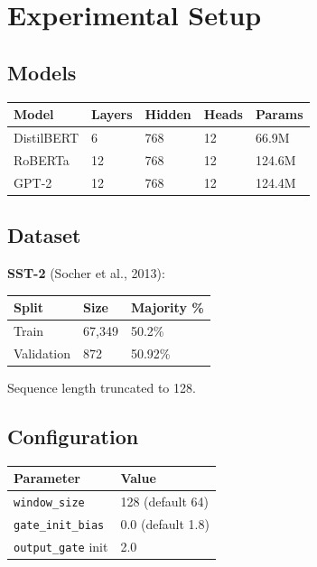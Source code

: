 
\section{Experimental Setup}

\subsection{Models}

\begin{table}[H]
\centering
\small
\begin{tabular}{lllll}
\toprule
\textbf{Model} & \textbf{Layers} & \textbf{Hidden} & \textbf{Heads} & \textbf{Params} \\
\midrule
DistilBERT & 6 & 768 & 12 & 66.9M \\
RoBERTa & 12 & 768 & 12 & 124.6M \\
GPT-2 & 12 & 768 & 12 & 124.4M \\
\bottomrule
\end{tabular}
\end{table}

\subsection{Dataset}

\textbf{SST-2} (Socher et al., 2013):

\begin{table}[H]
\centering
\small
\begin{tabular}{lll}
\toprule
\textbf{Split} & \textbf{Size} & \textbf{Majority \%} \\
\midrule
Train & 67,349 & 50.2\% \\
Validation & 872 & 50.92\% \\
\bottomrule
\end{tabular}
\end{table}

Sequence length truncated to 128.

\subsection{Configuration}

\begin{table}[H]
\centering
\small
\begin{tabular}{ll}
\toprule
\textbf{Parameter} & \textbf{Value} \\
\midrule
\texttt{window\_size} & 128 (default 64) \\
\texttt{gate\_init\_bias} & 0.0 (default 1.8) \\
\texttt{output\_gate} init & 2.0 \\
\bottomrule
\end{tabular}
\end{table}

